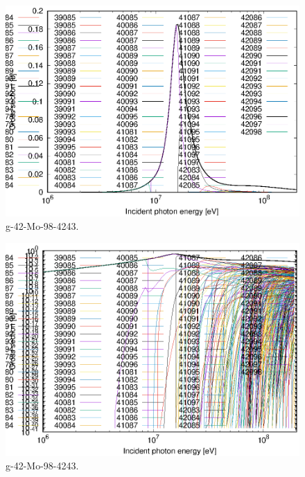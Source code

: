 \begin{figure}
 \includegraphics[width=\linewidth]{eps/g_42-Mo-98_4243.eps}
  \caption{g-42-Mo-98-4243.}
\end{figure}
\begin{figure}
 \includegraphics[width=\linewidth]{eps-log/g_42-Mo-98_4243.eps}
 \caption{g-42-Mo-98-4243.}
\end{figure}
\newpage \clearpage

